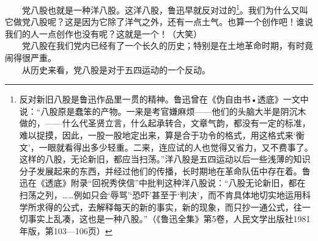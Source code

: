 \documentclass[cn,11pt,chinese]{elegantbook}
\begin{document}
　　党八股也就是一种洋八股。这洋八股，鲁迅早就反对过的\footnote[4]{ 反对新旧八股是鲁迅作品里一贯的精神。鲁迅曾在《伪自由书•透底》一文中说：“八股原是蠢笨的产物。一来是考官嫌麻烦——他们的头脑大半是阴沉木做的，——什么代圣贤立言，什么起承转合，文章气韵，都没有一定的标准，难以捉摸，因此，一股一股地定出来，算是合于功令的格式，用这格式来‘衡文’，一眼就看得出多少轻重。二来，连应试的人也觉得又省力，又不费事了。这样的八股，无论新旧，都应当扫荡。”洋八股是五四运动以后一些浅薄的知识分子发展起来的东西，并经过他们的传播，长时期地在革命队伍中存在着。鲁迅在《透底》附录“回祝秀侠信”中批判这种洋八股说：“八股无论新旧，都在扫荡之列，……例如只会‘辱骂’‘恐吓’甚至于‘判决’，而不肯具体地切实地运用科学所求得的公式，去解释每天的新的事实，新的现象，而只抄一通公式，往一切事实上乱凑，这也是一种八股。”（《鲁迅全集》第5卷，人民文学出版社1981年版，第103—106页）}。我们为什么又叫它做党八股呢？这是因为它除了洋气之外，还有一点土气。也算一个创作吧！谁说我们的人一点创作也没有呢？这就是一个！（大笑）\\
　　党八股在我们党内已经有了一个长久的历史；特别是在土地革命时期，有时竟闹得很严重。\\
　　从历史来看，党八股是对于五四运动的一个反动。\\
\end{document}
